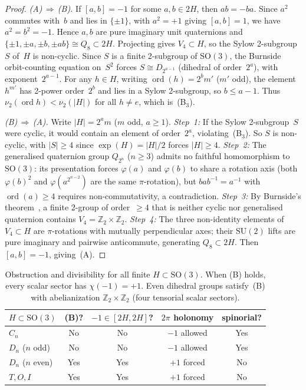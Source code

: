 \documentclass[12pt]{article}
\theoremstyle{definition}
\theoremstyle{remark}
\newcommand{\ZZ}{\mathbb{Z}}
\newcommand{\SU}{\mathrm{SU}}
\newcommand{\SO}{\mathrm{SO}}
\DeclareMathOperator{\ord}{ord}
\begin{document}
\begin{proof}
  \emph{(A)$\,\Rightarrow\,$(B).}\;
  If $[a,b] = -1$ for some $a,b\in 2H$,
  then $ab = -ba$.
  Since $a^2$ commutes with~$b$ and lies in
  $\{\pm 1\}$, with $a^2 = +1$ giving $[a,b] = 1$,
  we have $a^2 = b^2 = -1$.
  Hence $a,b$ are pure imaginary unit quaternions and
  $\{\pm 1,\pm a,\pm b,\pm ab\}\cong Q_8\subset 2H$.
  Projecting gives $V_4\subset H$, so the
  Sylow 2-subgroup~$S$ of~$H$ is non-cyclic.
  Since $S$ is a finite 2-subgroup of $\SO(3)$, the
  Burnside orbit-counting equation on~$S^2$
  forces $S \cong D_{2^{a-1}}$
  (dihedral of order~$2^a$), with exponent~$2^{a-1}$.
  For any $h \in H$, writing $\ord(h) = 2^b m'$ ($m'$ odd),
  the element $h^{m'}$ has 2-power order~$2^b$ and lies
  in a Sylow 2-subgroup, so $b \le a{-}1$.
  Thus $\nu_2(\ord h) < \nu_2(|H|)$ for all
  $h\neq e$, which is~(B${}_3$).

  \emph{(B)$\,\Rightarrow\,$(A).}\;
  Write $|H|=2^a m$ ($m$ odd, $a\ge 1$).
  \emph{Step~1:} If the Sylow 2-subgroup~$S$ were cyclic,
  it would contain an element of order~$2^a$,
  violating~(B${}_3$).  So $S$ is non-cyclic,
  with $|S|\ge 4$ since $\exp(H) = |H|/2$ forces $|H| \ge 4$.
  \emph{Step~2:} The generalised quaternion group
  $Q_{2^n}$ ($n\ge 3$) admits no faithful homomorphism
  to~$\SO(3)$: its presentation forces
  $\varphi(a)$ and $\varphi(b)$ to share a rotation axis
  (both $\varphi(b)^2$ and $\varphi(a^{2^{n-2}})$
  are the same $\pi$-rotation), but $bab^{-1}=a^{-1}$
  with $\ord(a)\ge 4$ requires non-commutativity,
  a contradiction.
  \emph{Step~3:} By Burnside's theorem~\cite{Gorenstein1980},
  a finite 2-group of order~$\ge 4$ that is
  neither cyclic nor generalised quaternion contains
  $V_4 = \ZZ_2\times\ZZ_2$.
  \emph{Step~4:} The three non-identity elements of
  $V_4\subset H$ are $\pi$-rotations with mutually
  perpendicular axes; their $\SU(2)$ lifts are pure
  imaginary and pairwise anticommute, generating
  $Q_8\subset 2H$.
  Then $[a,b]=-1$, giving~(A).
\end{proof}

\begin{table}[ht]
\centering
\begin{tabular}{@{}lcccc@{}}
  \toprule
  $H \subset \SO(3)$ & (B)? & $-1 \in [2H,2H]$?
    & $2\pi$ holonomy & spinorial? \\
  \midrule
  $C_n$ & No & No & $-1$ allowed & Yes \\
  $D_n$ ($n$ odd) & No & No & $-1$ allowed & Yes \\
  $D_n$ ($n$ even) & Yes & Yes & $+1$ forced & No \\
  $T,O,I$ & Yes & Yes & $+1$ forced & No \\
  \bottomrule
\end{tabular}
\caption{Obstruction and divisibility for all finite
  $H \subset \SO(3)$.
  When (B) holds, every scalar sector has $\chi(-1) = +1$.
  Even dihedral groups satisfy~(B) with
  abelianization $\ZZ_2 \times \ZZ_2$
  (four tensorial scalar sectors).}
\label{tab:obstruction-summary}
\end{table}
\end{document}
